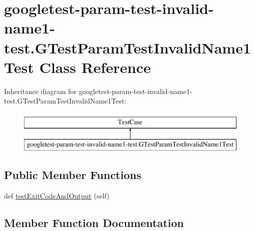 \hypertarget{classgoogletest-param-test-invalid-name1-test_1_1GTestParamTestInvalidName1Test}{}\section{googletest-\/param-\/test-\/invalid-\/name1-\/test.G\+Test\+Param\+Test\+Invalid\+Name1\+Test Class Reference}
\label{classgoogletest-param-test-invalid-name1-test_1_1GTestParamTestInvalidName1Test}
Inheritance diagram for googletest-\/param-\/test-\/invalid-\/name1-\/test.G\+Test\+Param\+Test\+Invalid\+Name1\+Test\+:\begin{figure}[H]
\begin{center}
\leavevmode
\includegraphics[height=2.000000cm]{classgoogletest-param-test-invalid-name1-test_1_1GTestParamTestInvalidName1Test}
\end{center}
\end{figure}
\subsection*{Public Member Functions}
\begin{DoxyCompactItemize}
\item 
def \mbox{\hyperlink{classgoogletest-param-test-invalid-name1-test_1_1GTestParamTestInvalidName1Test_a2b7024a50e0b3b0fe9b0c6d28e470681}{test\+Exit\+Code\+And\+Output}} (self)
\end{DoxyCompactItemize}


\subsection{Member Function Documentation}
\mbox{\label{classgoogletest-param-test-invalid-name1-test_1_1GTestParamTestInvalidName1Test_a2b7024a50e0b3b0fe9b0c6d28e470681}} 
